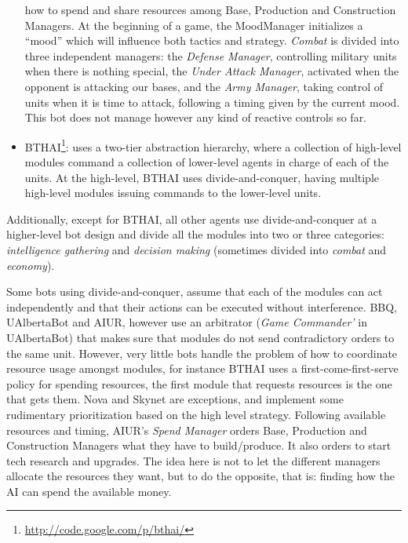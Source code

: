 \documentclass[journal]{IEEEtran}
\begin{document}
\begin{itemize}
  how  to  spend  and  share  resources  among  Base,  Production  and
  Construction Managers.  At the beginning of a  game, the MoodManager
  initializes  a  ``mood''  which  will  influence  both  tactics  and
  strategy. {\em Combat} is divided into three  independent managers: the
  {\em  Defense Manager},  controlling  military units  when there  is
  nothing special, the {\em  Under Attack Manager}, activated when the
  opponent is attacking our bases,  and the {\em Army Manager}, taking
  control of units when it is time to attack, following a timing given
  by the  current mood. This bot  does not manage however  any kind of
  reactive controls so far.
\item  BTHAI\footnote{\url{http://code.google.com/p/bthai/}}:  uses  a
  two-tier  abstraction hierarchy,  where a  collection  of high-level
  modules command a collection of lower-level agents in charge of each
  of  the units.  At  the high-level,  BTHAI uses  divide-and-conquer,
  having   multiple  high-level  modules   issuing  commands   to  the
  lower-level units.
\end{itemize}

Additionally, except for BTHAI, all other agents use divide-and-conquer at a higher-level bot design and divide all the modules into two or three categories: {\em intelligence gathering} and {\em decision making} (sometimes divided into {\em combat} and {\em economy}).

Some bots  using divide-and-conquer, assume  that each of  the modules
can act independently  and that their actions can  be executed without
interference.  BBQ,  UAlbertaBot and  AIUR, however use  an arbitrator
({\em Game Commander'} in UAlbertaBot) that makes sure that modules do
not send contradictory orders to  the same unit.  However, very little
bots handle  the problem of  how to coordinate resource  usage amongst
modules, for  instance BTHAI uses a  first-come-first-serve policy for
spending resources,  the first module  that requests resources  is the
one that gets them. Nova and Skynet are exceptions, and implement some
rudimentary prioritization based on the high level strategy. Following
available  resources and  timing,  AIUR's {\em  Spend Manager}  orders
Base,  Production   and  Construction  Managers  what   they  have  to
build/produce. It also orders to start tech research and upgrades. The
idea here is not to let the different managers allocate the resources they want, but to do the opposite, that is: finding how the AI can
spend the available money.
\end{document}
